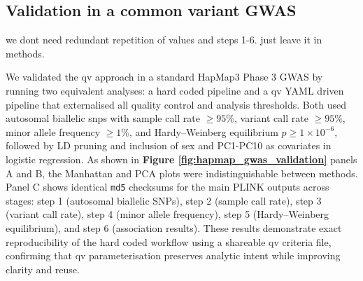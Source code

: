 \subsection{Validation in a common variant GWAS}

we dont need redundant repetition of values and steps 1-6. just leave it in methods. 

We validated the \ac{qv} approach in a standard HapMap3 Phase 3 GWAS by running two equivalent analyses: a hard coded pipeline and a \ac{qv} YAML driven pipeline that externalised all quality control and analysis thresholds. Both used autosomal biallelic \ac{snp}s with sample call rate $\geq 95\%$, variant call rate $\geq 95\%$, minor allele frequency $\geq 1\%$, and Hardy–Weinberg equilibrium $p \geq 1\times10^{-6}$, followed by LD pruning and inclusion of sex and PC1-PC10 as covariates in logistic regression. As shown in \textbf{Figure \ref{fig:hapmap_gwas_validation}} panels A and B, the Manhattan and PCA plots were indistinguishable between methods. Panel C shows identical \texttt{md5} checksums for the main PLINK outputs across stages: step 1 (autosomal biallelic SNPs), step 2 (sample call rate), step 3 (variant call rate), step 4 (minor allele frequency), step 5 (Hardy–Weinberg equilibrium), and step 6 (association results). These results demonstrate exact reproducibility of the hard coded workflow using a shareable \ac{qv} criteria file, confirming that \ac{qv} parameterisation preserves analytic intent while improving clarity and reuse.

